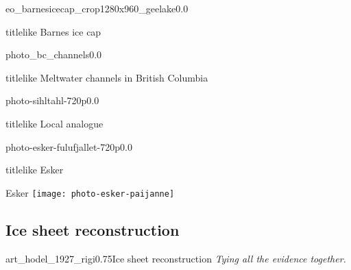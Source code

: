     \begin{backgroundframe}[b]{eo_barnesicecap_crop1280x960_geelake}{0.0}{}
      \begin{beamercolorbox}[sep=1em,wd=45mm]{titlelike}
        Barnes ice cap
      \end{beamercolorbox}
    \end{backgroundframe}

    \begin{backgroundframe}[b]{photo_bc_channels}{0.0}{}
      \begin{beamercolorbox}[sep=1em,wd=45mm]{titlelike}
        Meltwater channels in British Columbia
      \end{beamercolorbox}
    \end{backgroundframe}

    \begin{backgroundframe}[b]{photo-sihltahl-720p}{0.0}{}
      \hfill
      \begin{beamercolorbox}[sep=1em,wd=45mm]{titlelike}
        Local analogue
      \end{beamercolorbox}
    \end{backgroundframe}

    \begin{backgroundframe}[b]{photo-esker-fulufjallet-720p}{0.0}{}
      \begin{beamercolorbox}[sep=1em,wd=45mm]{titlelike}
        Esker
      \end{beamercolorbox}
    \end{backgroundframe}

    \begin{frame}{Esker}
      \texttt{[image: photo-esker-paijanne]}
    \end{frame}


\subsection{Ice sheet reconstruction}

    \begin{sectionframe}{art_hodel_1927_rigi}{0.75}{Ice sheet reconstruction}
      \emph{Tying all the evidence together.}
    \end{sectionframe}

